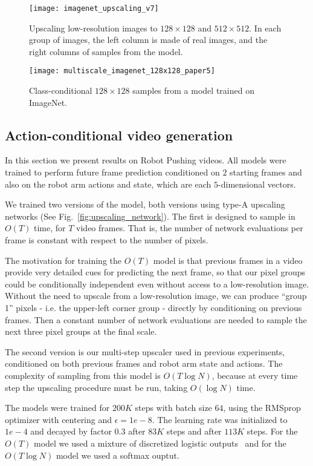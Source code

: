 \documentclass{article}
\begin{document}
\begin{figure*}[t!]
\centering
\texttt{[image: imagenet\_upscaling\_v7]}
\vspace{-0.3in}
\caption{Upscaling low-resolution images to $128 \times 128$ and $512 \times 512$. In each group of images, the left column is made of real images, and the right columns of samples from the model.\label{fig:imagenet1}}
\vspace{0.1in}
\texttt{[image: multiscale\_imagenet\_128x128\_paper5]}
\vspace{-0.3in}
\caption{Class-conditional $128 \times 128$ samples from a model trained on ImageNet.\label{fig:imagenet2}}
\vspace{-0.1in}
\end{figure*}

\subsection{Action-conditional video generation}
In this section we present results on Robot Pushing videos.
All models were trained to perform future frame prediction conditioned on $2$ starting frames and also on the robot arm actions and state, which are each $5$-dimensional vectors.


We trained two versions of the model, both versions using type-A upscaling networks (See Fig.~\ref{fig:upscaling_network}).
The first is designed to sample in $O(T)$ time, for $T$ video frames.
That is, the number of network evaluations per frame is constant with respect to the number of pixels.


The motivation for training the $O(T)$ model is that previous frames in a video provide very detailed cues for predicting the next frame, so that our pixel groups could be conditionally independent even without access to a low-resolution image.
Without the need to upscale from a low-resolution image, we can produce ``group 1'' pixels - i.e. the upper-left corner group - directly by conditioning on previous frames.
Then a constant number of network evaluations are needed to sample the next three pixel groups at the final scale.

The second version is our multi-step upscaler used in previous experiments, conditioned on both previous frames and robot arm state and actions.
The complexity of sampling from this model is $O(T \log N)$, because at every time step the upscaling procedure must be run, taking $O(\log N)$ time.


The models were trained for $200K$ steps with batch size $64$, using the RMSprop optimizer with centering and $\epsilon = 1e-8$.
The learning rate was initialized to $1e-4$ and decayed by factor $0.3$ after $83K$ steps and after $113K$ steps.
For the $O(T)$ model we used a mixture of discretized logistic outputs~\cite{salimans2017pixelcnn} and for the $O(T\log N)$ model we used a softmax ouptut.
\end{document}
